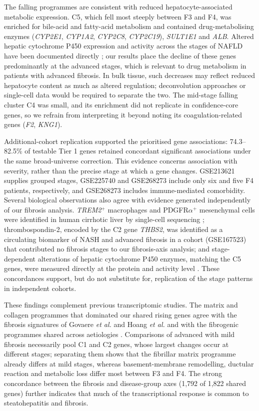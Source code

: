 \documentclass[11pt,a4paper]{article}
\begin{document}
The falling programmes are consistent with reduced hepatocyte-associated metabolic expression. C5, which fell most steeply between F3 and F4, was enriched for bile-acid and fatty-acid metabolism and contained drug-metabolising enzymes (\textit{CYP2E1}, \textit{CYP1A2}, \textit{CYP2C8}, \textit{CYP2C19}), \textit{SULT1E1} and \textit{ALB}. Altered hepatic cytochrome P450 expression and activity across the stages of NAFLD have been documented directly \cite{fisher2009}; our results place the decline of these genes predominantly at the advanced stages, which is relevant to drug metabolism in patients with advanced fibrosis. In bulk tissue, such decreases may reflect reduced hepatocyte content as much as altered regulation; deconvolution approaches \cite{avilacobos2020} or single-cell data would be required to separate the two. The mid-stage falling cluster C4 was small, and its enrichment did not replicate in confidence-core genes, so we refrain from interpreting it beyond noting its coagulation-related genes (\textit{F2}, \textit{KNG1}).

Additional-cohort replication supported the prioritised gene associations: 74.3--82.5\% of testable Tier 1 genes retained concordant significant associations under the same broad-universe correction. This evidence concerns association with severity, rather than the precise stage at which a gene changes. GSE213621 supplies grouped stages, GSE225740 and GSE268273 include only six and five F4 patients, respectively, and GSE268273 includes immune-mediated comorbidity. Several biological observations also agree with evidence generated independently of our fibrosis analysis. \textit{TREM2}$^{+}$ macrophages and PDGFR$\alpha^{+}$ mesenchymal cells were identified in human cirrhotic liver by single-cell sequencing \cite{ramachandran2019}; thrombospondin-2, encoded by the C2 gene \textit{THBS2}, was identified as a circulating biomarker of NASH and advanced fibrosis \cite{kozumi2021} in a cohort (GSE167523) that contributed no fibrosis stages to our fibrosis-axis analysis; and stage-dependent alterations of hepatic cytochrome P450 enzymes, matching the C5 genes, were measured directly at the protein and activity level \cite{fisher2009}. These concordances support, but do not substitute for, replication of the stage patterns in independent cohorts.

These findings complement previous transcriptomic studies. The matrix and collagen programmes that dominated our shared rising genes agree with the fibrosis signatures of Govaere \textit{et al.} and Hoang \textit{et al.} \cite{govaere2020,hoang2019} and with the fibrogenic programmes shared across aetiologies \cite{yang2026}. Comparisons of advanced with mild fibrosis \cite{maiers2026,piras2024} necessarily pool C1 and C2 genes, whose largest changes occur at different stages; separating them shows that the fibrillar matrix programme already differs at mild stages, whereas basement-membrane remodelling, ductular reaction and metabolic loss differ most between F3 and F4. The strong concordance between the fibrosis and disease-group axes (1,792 of 1,822 shared genes) further indicates that much of the transcriptional response is common to steatohepatitis and fibrosis.
\end{document}
